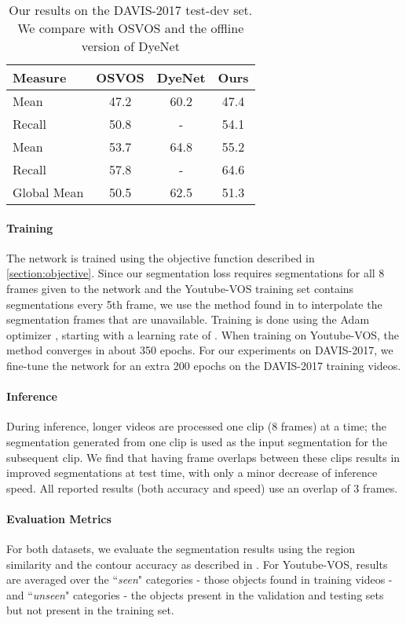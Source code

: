 \documentclass[10pt,twocolumn,letterpaper]{article}
\begin{document}
\begin{table}[ht!]
    \centering
    \begin{tabular}{l|c|c|c}
        Measure & OSVOS \cite{caelles2017one} & DyeNet \cite{li2018video} & Ours \\
        \hline
         Mean  & 47.2 & 60.2  & 47.4 \\
         Recall  & 50.8 & -  & 54.1 \\
\hline
         Mean  & 53.7 & 64.8  & 55.2 \\
         Recall  & 57.8 & - & 64.6 \\
\hline
        Global Mean & 50.5 & 62.5 & 51.3 \\
    \end{tabular}
    \caption{Our results on the DAVIS-2017 test-dev set. We compare with OSVOS \cite{caelles2017one} and the offline version of DyeNet \cite{li2018video}}
    \label{tab:davis}
\end{table}

\paragraph{Training} 
The network is trained using the objective function described in \ref{section:objective}. Since our segmentation loss requires segmentations for all 8 frames given to the network and the Youtube-VOS training set contains segmentations every 5th frame, we use the method found in \cite{niklaus2017video} to interpolate the segmentation frames that are unavailable. Training is done using the Adam optimizer \cite{kingma2014adam}, starting with a learning rate of . When training on Youtube-VOS, the method converges in about 350 epochs. For our experiments on DAVIS-2017, we fine-tune the network for an extra 200 epochs on the DAVIS-2017 training videos.

\paragraph{Inference} 
During inference, longer videos are processed one clip (8 frames) at a time; the segmentation generated from one clip is used as the input segmentation for the subsequent clip. We find that having frame overlaps between these clips results in improved segmentations at test time, with only a minor decrease of inference speed. All reported results (both accuracy and speed) use an overlap of 3 frames.



\paragraph{Evaluation Metrics}
For both datasets, we evaluate the segmentation results using the region similarity  and the contour accuracy  as described in \cite{perazzi2016benchmark}. For Youtube-VOS, results are averaged over the ``{\it seen}" categories - those objects found in training videos - and ``{\it unseen}" categories - the objects present in the validation and testing sets but not present in the training set.
\end{document}
